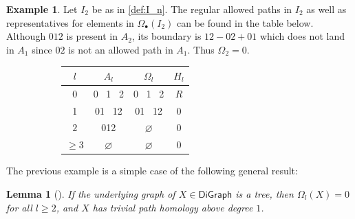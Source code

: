 \documentclass[11pt]{article}
\newtheorem{lemma}[theo]{Lemma}
\theoremstyle{definition}
\newtheorem{example}[theo]{Example}
\numberwithin{equation}{section}
\newcommand{\DiGraph}{\mathsf{DiGraph}}
\begin{document}
\begin{example}\label{ex:homology_In}
Let $I_2$ be as in \cref{def:I_n}. The regular allowed paths in $I_2$ as well as representatives for elements in $\Omega_\bullet (I_2)$ can be found in the table below.
Although $012$ is present in $A_2$, its boundary is $12 - 02 + 01$ which does not land in $A_1$ since $02$ is not an allowed path in $A_1$.
Thus $\Omega_2 = 0$.

\begin{figure}[H]
\centering
 \begin{subfigure}[c]{0.4\textwidth}
\end{subfigure}
\begin{subfigure}[c]{0.5\textwidth}
    \centering
\begin{tabular}{||c||  c | c | c ||} 
 \hline
 $l$ &  $A_l$ & $\Omega_l$ & $H_l$ \\ [.5ex] 
 \hline\hline
0 &  0 \, 1 \, 2  & 0 \, 1 \, 2 & $R$  \\ 
 \hline
 1 &  01 \, 12  & 01 \, 12 & 0  \\
 \hline
 $2$ & 012 & $\varnothing$ & 0 \\
 \hline
 $\geq 3$ & $\varnothing$ & $\varnothing$ & 0 \\
 \hline
\end{tabular}
\end{subfigure}
\end{figure}
\end{example}

The previous example is a simple case of the following general result:

\begin{lemma}[{\cite[Cor.~4.6]{grigor'yan-lin-muranov-yau}}]\label{rmk:tree_homology} 
If the underlying graph of $X \in \DiGraph$ is a tree, then $\Omega_l(X) = 0$ for all $l \geq 2$, and $X$ has trivial path homology above degree $1$.
\end{lemma}
\end{document}
